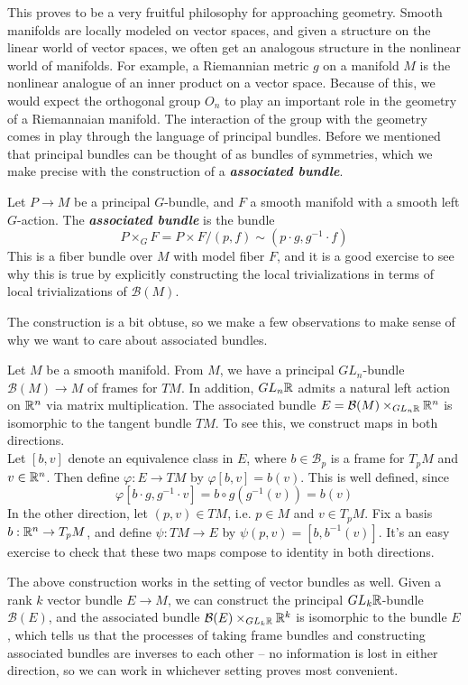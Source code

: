 \documentclass[abstract=on,twoside]{scrreprt}
\begin{document}
This proves to be a very fruitful philosophy for approaching geometry. Smooth manifolds
are locally modeled on vector spaces, and given a structure on the linear world
of vector spaces, we often get an analogous structure in the nonlinear world of
manifolds. For example, a Riemannian metric $g$ on a manifold $M$ is the nonlinear
analogue of an inner product on a vector space. Because of this, we would expect
the orthogonal group $O_n$ to play an important role in the geometry of a Riemannaian
manifold. The interaction of the group with the geometry comes in play through the
language of principal bundles. Before we mentioned that principal bundles can be
thought of as bundles of symmetries, which we make precise with the construction of
a \textbf{\textit{associated bundle}}.
%
\begin{definition}
Let $P \to M$ be a principal $G$-bundle, and $F$ a smooth manifold with a smooth
left $G$-action. The \textbf{\textit{associated bundle}} is the bundle
\[
P \times_G F = P \times F / (p, f) \sim (p \cdot g, g^{-1} \cdot f)
\]
This is a fiber bundle over $M$ with model fiber $F$, and it is a good exercise to see
why this is true by explicitly constructing the local trivializations in terms
of local trivializations of $\mathcal{B}(M)$.
\end{definition}
%
The construction is a bit obtuse, so we make a few observations to make sense of
why we want to care about associated bundles.
%
\begin{example}
Let $M$ be a smooth manifold. From $M$, we have a principal $GL_n$-bundle
$\mathcal{B}(M) \to M$ of frames for $TM$. In addition, $GL_n\mathbb{R}$ admits a natural
left action on $\mathbb{R}^n$ via matrix multiplication. The associated bundle
$E = \mathcal{B}(M) \times_{GL_n\mathbb{R}} \mathbb{R}^n$ is isomorphic to the tangent bundle
$TM$. To see this, we construct maps in both directions. \\

Let $[b, v]$ denote an equivalence class in $E$, where $b \in \mathcal{B}_p$ is a
frame for $T_pM$ and $v \in \mathbb{R}^n$. Then define $\varphi : E \to TM$ by
$\varphi[b,v] = b(v)$. This is well defined, since
\[
\varphi[b\cdot g, g^{-1}\cdot v] = b \circ g(g^{-1}(v)) = b(v)
\]
In the other direction, let $(p,v) \in TM$, i.e. $p \in M$ and $v \in T_pM$. Fix
a basis $b : \mathbb{R}^n \to T_pM$, and define $\psi : TM \to E$ by
$\psi(p,v) = [b,b^{-1}(v)]$. It's an easy exercise to check that these two maps compose
to identity in both directions.
\end{example}
%
The above construction works in the setting of vector bundles as well. Given
a rank $k$ vector bundle $E \to M$, we can construct the principal $GL_k\mathbb{R}$-bundle
$\mathcal{B}(E)$, and the associated bundle $\mathcal{B}(E) \times_{GL_k\mathbb{R}} \mathbb{R}^k$ is
isomorphic to the bundle $E$, which tells us that the processes of taking frame bundles
and constructing associated bundles are inverses to each other -- no information
is lost in either direction, so we can work in whichever setting proves most
convenient. \\
%
\end{document}

